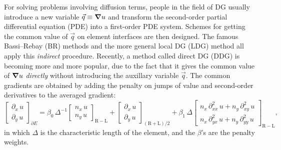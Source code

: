 \documentclass[10pt]{article}
\begin{document}
%
For solving problems involving diffusion terms, people in the field of DG usually introduce a new variable $\vec{q} \equiv \grad u$ and transform the second-order partial differential equation (PDE) into a first-order PDE system.
%
Schemes for getting the common value of $\vec{q}$ on element interfaces are then designed.
%
The famous Bassi--Rebay (BR) methods \cite{Bassi_1997,Bassi_2005} and the more general local DG (LDG) method \cite{Cockburn_1998b} all apply this \emph{indirect} procedure.
%
Recently, a method called direct DG (DDG) \cite{Liu_2009_DDG,Cheng_2016,Yang_2019} is becoming more and more popular, due to the fact that it gives the common value of $\grad u$ \emph{directly} without introducing the auxillary variable $\vec{q}$.
%
The common gradients are obtained by adding the penalty on jumps of value and second-order derivatives to the averaged gradient:
$$
\begin{bmatrix}\partial_{x}\,u\\
\partial_{y}\,u
\end{bmatrix}_{\partial E}=\beta_{0}\,\Delta^{-1}\begin{bmatrix}n_{x}\,u\\
n_{y}\,u
\end{bmatrix}_{\mathrm{R}-\mathrm{L}}+\begin{bmatrix}\partial_{x}\,u\\
\partial_{y}\,u
\end{bmatrix}_{(\mathrm{R}+\mathrm{L})/2}+\beta_{1}\,\Delta
\begin{bmatrix}
n_x\,\partial^2_{xx}\,u + n_y\,\partial^2_{xy}\,u\\
n_x\,\partial^2_{yx}\,u + n_y\,\partial^2_{yy}\,u
\end{bmatrix}_{\mathrm{R}-\mathrm{L}},
$$
in which $\Delta$ is the characteristic length of the element, and the $\beta$'s are the penalty weights.
%
\end{document}

